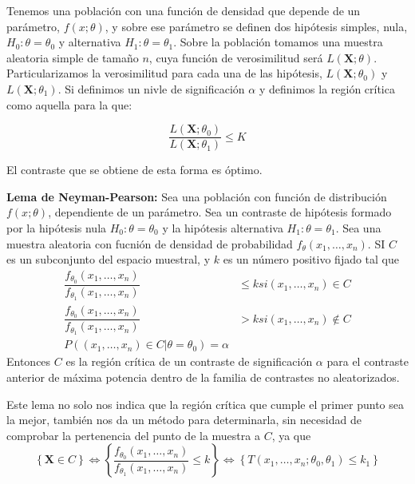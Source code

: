 

Tenemos una poblaci\'on con una funci\'on de densidad que depende de un par\'ametro, $f(x;\theta)$, y sobre ese par\'ametro se definen dos hip\'otesis simples, nula, $H_0:\theta=\theta_0$ y alternativa $H_1:\theta=\theta_1$. Sobre la poblaci\'on tomamos una muestra aleatoria simple de tama\~no $n$, cuya funci\'on de verosimilitud ser\'a $L(\boldsymbol{X};\theta)$. Particularizamos la verosimilitud para cada una de las hip\'otesis, $L(\boldsymbol{X};\theta_0)$ y $L(\boldsymbol{X};\theta_1)$. Si definimos un nivle de significaci\'on $\alpha$ y definimos la regi\'on cr\'itica como aquella para la que:

\begin{equation*}
\dfrac{L(\boldsymbol{X};\theta_0)}{L(\boldsymbol{X};\theta_1)}\leq K
\end{equation*}

El contraste que se obtiene de esta forma es \'optimo.

\begin{teorema}
\textbf{Lema de Neyman-Pearson:} Sea una poblaci\'on con funci\'on de distribuci\'on $f(x;\theta)$, dependiente de un par\'ametro. Sea un contraste de hip\'otesis formado por la hip\'otesis nula $H_0:\theta=\theta_0$ y la hip\'otesis alternativa $H_1:\theta=\theta_1$. Sea una muestra aleatoria con fucni\'on de densidad de probabilidad $f_{\theta}(x_1,\ldots,x_n)$. SI $C$ es un subconjunto del espacio muestral, y $k$ es un n\'umero positivo fijado tal que
\begin{align*}
\dfrac{f_{\theta_0}(x_1,\ldots,x_n)}{f_{\theta_1}(x_1,\ldots,x_n)}&\leq k si (x_1,\ldots,x_n) \in C \\
\dfrac{f_{\theta_0}(x_1,\ldots,x_n)}{f_{\theta_1}(x_1,\ldots,x_n)}&> k si (x_1,\ldots,x_n) \notin C \\
P((x_1,\ldots,x_n) \in C|\theta=\theta_0)=\alpha
\end{align*}
Entonces $C$ es la regi\'on cr\'itica de un contraste de significaci\'on $\alpha$ para el contraste anterior de m\'axima potencia dentro de la familia de contrastes no aleatorizados.
\end{teorema}

Este lema no solo nos indica que la regi\'on cr\'itica que cumple el primer punto sea la mejor, tambi\'en nos da un m\'etodo para determinarla, sin necesidad de comprobar la pertenencia del punto de la muestra a $C$, ya que 
\begin{equation*}
\left\{\boldsymbol{X}\in C\right\}\iff \left\{\dfrac{f_{\theta_0}(x_1,\ldots,x_n)}{f_{\theta_1}(x_1,\ldots,x_n)}\leq k\right\}\iff\left\{T(x_1,\ldots,x_n;\theta_0,\theta_1)\leq k_1\right\}
\end{equation*}

